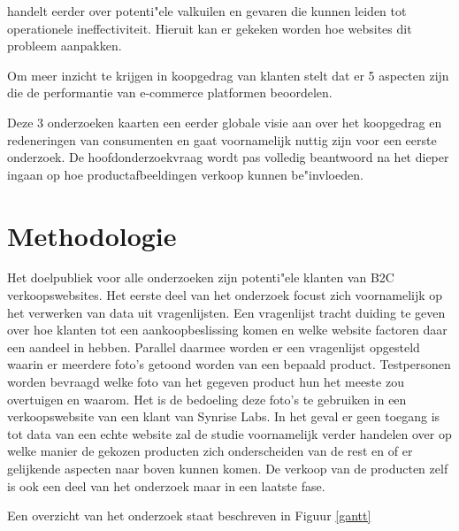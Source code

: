 \cite{Yang2016} handelt eerder over potenti"ele valkuilen en gevaren die kunnen leiden tot operationele ineffectiviteit. Hieruit kan er gekeken worden hoe websites dit probleem aanpakken.

Om meer inzicht te krijgen in koopgedrag van klanten stelt \cite{Li2015} dat er 5 aspecten zijn die de performantie van e-commerce platformen beoordelen.

Deze 3 onderzoeken kaarten een eerder globale visie aan over het koopgedrag en redeneringen van consumenten en gaat voornamelijk nuttig zijn voor een eerste onderzoek. De hoofdonderzoekvraag wordt pas volledig beantwoord na het dieper ingaan op hoe productafbeeldingen verkoop kunnen be"invloeden.
\section{Methodologie}
\label{sec:methodologie}


Het doelpubliek voor alle onderzoeken zijn potenti"ele klanten van B2C verkoopswebsites.
Het eerste deel van het onderzoek focust zich voornamelijk op het verwerken van data uit vragenlijsten. Een vragenlijst tracht duiding te geven over hoe klanten tot een aankoopbeslissing komen en welke website factoren daar een aandeel in hebben. 
Parallel daarmee worden er een vragenlijst opgesteld waarin er meerdere foto's getoond worden van een bepaald product. Testpersonen worden bevraagd welke foto van het gegeven product hun het meeste zou overtuigen en waarom. Het is de bedoeling deze foto's te gebruiken in een verkoopswebsite van een klant van Synrise Labs. In het geval er geen toegang is tot data van een echte website zal de studie voornamelijk verder handelen over op welke manier de gekozen producten zich onderscheiden van de rest en of er gelijkende aspecten naar boven kunnen komen.
De verkoop van de producten zelf is ook een deel van het onderzoek maar in een laatste fase. 

Een overzicht van het onderzoek staat beschreven in Figuur \ref{gantt}

